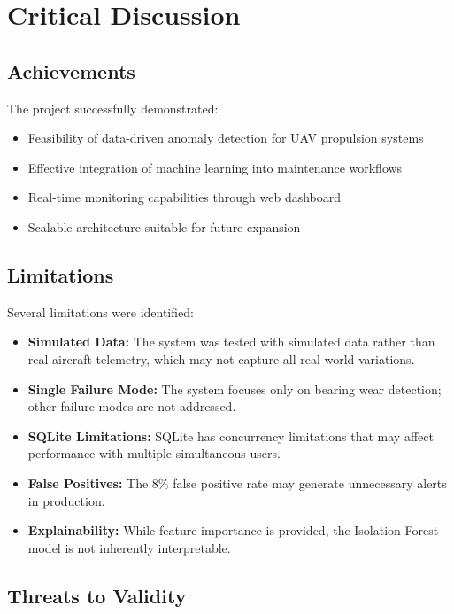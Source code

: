 \section{Critical Discussion}

\subsection{Achievements}

The project successfully demonstrated:
\begin{itemize}
    \item Feasibility of data-driven anomaly detection for UAV propulsion systems
    \item Effective integration of machine learning into maintenance workflows
    \item Real-time monitoring capabilities through web dashboard
    \item Scalable architecture suitable for future expansion
\end{itemize}

\subsection{Limitations}

Several limitations were identified:
\begin{itemize}
    \item \textbf{Simulated Data:} The system was tested with simulated data rather than real aircraft telemetry, which may not capture all real-world variations.
    \item \textbf{Single Failure Mode:} The system focuses only on bearing wear detection; other failure modes are not addressed.
    \item \textbf{SQLite Limitations:} SQLite has concurrency limitations that may affect performance with multiple simultaneous users.
    \item \textbf{False Positives:} The 8\% false positive rate may generate unnecessary alerts in production.
    \item \textbf{Explainability:} While feature importance is provided, the Isolation Forest model is not inherently interpretable.
\end{itemize}

\subsection{Threats to Validity}

